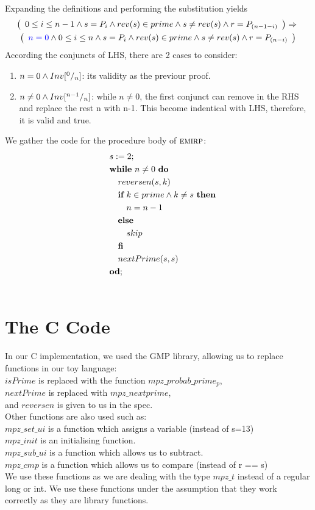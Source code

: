 \documentclass[headings=small,a4paper,12pt]{scrartcl}
\newcommand{\emirp}{\textsc{emirp}\xspace}
\begin{document}
Expanding the definitions and performing the substitution yields
\begin{gather*}
\left(
\begin{array}{l}
	0\leq i\leq n-1\wedge s=P_i\wedge rev(s)\in prime \wedge s\neq rev(s)\wedge r=P_{(n-1-i)}
\end{array}
\right)
	\Rightarrow{}\\
\left(
\begin{array}{l}
	{\color{blue}n=0} \wedge 0\leq i\leq n\wedge s=P_i\wedge rev(s)\in prime \wedge s\neq rev(s)\wedge r=P_{(n-i)} 
\end{array}
\right)
\end{gather*}
According the conjuncts of LHS, there are 2 cases to consider:
\begin{enumerate}
	\item $n = 0 \wedge Inv[^{0}/_{n}]$: its validity as the previour proof.
	\item $n \neq 0 \wedge Inv[^{n-1}/_{n}]$: while $n \neq 0$, the {\color{blue}first conjunct} can remove in the RHS and replace the rest n with n-1. This become indentical with LHS, therefore, it is valid and true.
\end{enumerate}
\newpage
We gather the code for the procedure body of $\emirp$:
\begin{align*}
&\quad s \mathrel{:=} 2;\\
&\quad \text{\normalfont\bfseries while}~ n\neq 0 ~ \text{\normalfont\bfseries do}\\
&\qquad reversen(s,k)\\
&\qquad \text{\normalfont\bfseries if}~k \in prime \wedge k \neq s ~ \text{\normalfont\bfseries then}\\
&\quad\qquad n = n-1\\
&\qquad \text{\normalfont\bfseries else}\\
&\quad\qquad skip\\
&\qquad \text{\normalfont\bfseries fi}\\
&\qquad nextPrime(s,s)\\
&\quad \text{\normalfont\bfseries od};\\
&\end{align*}
\section{The C Code}
\label{sec:code}

In our C implementation, we used the GMP library, allowing us to replace functions in our toy language: \\
$isPrime$ is replaced with the function $mpz\_probab\_prime_p$,\\
$nextPrime$ is replaced with $mpz\_nextprime$,\\
and $reversen$ is given to us in the spec.\\
Other functions are also used such as:\\
$mpz\_set\_ui$ is a function which assigns a variable (instead of s=13)\\
$mpz\_init$ is an initialising function.\\
$mpz\_sub\_ui$ is a function which allows us to subtract.\\
$mpz\_cmp$ is a function which allows us to compare (instead of r == s)\\
We use these functions as we are dealing with the type $mpz\_t$ instead of a regular long or int.
We use these functions under the assumption that they work correctly as they are library functions.
\end{document}
